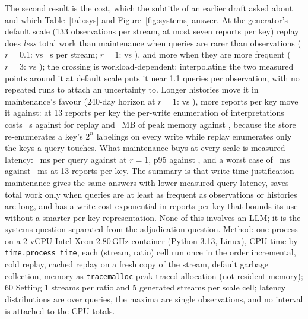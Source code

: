 The second result is the cost, which the subtitle of an earlier draft asked about and which Table~\ref{tab:sys} and Figure~\ref{fig:systems} answer. At the generator's default scale (133 observations per stream, at most seven reports per key) replay does \emph{less} total work than maintenance when queries are rarer than observations ($r=0.1$: \sysRpOneRepCpu{} vs \sysRpOneIncCpu{}~s per stream; $r=1$: \sysROneRepCpu{} vs \sysROneIncCpu{}), and more when they are more frequent ($r=3$: \sysRThreeRepCpu{} vs \sysRThreeIncCpu{}); the crossing is workload-dependent: interpolating the two measured points around it at default scale puts it near 1.1 queries per observation, with no repeated runs to attach an uncertainty to. Longer histories move it in maintenance's favour (240-day horizon at $r=1$: \sysTTwoFortyRepCpu{} vs \sysTTwoFortyIncCpu{}), more reports per key move it against: at 13 reports per key the per-write enumeration of interpretations costs \sysMThirteenIncCpu{}~s against \sysMThirteenRepCpu{} for replay and \sysMThirteenIncMem{}~MB of peak memory against \sysMThirteenRepMem{}, because the store re-enumerates a key's $2^n$ labelings on every write while replay enumerates only the keys a query touches. What maintenance buys at every scale is measured latency: \sysROneIncLat{}~ms per query against \sysROneRepLat{} at $r=1$, p95 \sysROneIncPNN{} against \sysROneRepPNN{}, and a worst case of \sysMThirteenIncMax{}~ms against \sysMThirteenRepMax{}~ms at 13 reports per key. The summary is that write-time justification maintenance gives the same answers with lower measured query latency, saves total work only when queries are at least as frequent as observations or histories are long, and has a write cost exponential in reports per key that bounds its use without a smarter per-key representation. None of this involves an LLM; it is the systems question separated from the adjudication question. Method: one process on a 2-vCPU Intel Xeon 2.80\,GHz container (Python 3.13, Linux), CPU time by \texttt{time.process\_time}, each (stream, ratio) cell run once in the order incremental, cold replay, cached replay on a fresh copy of the stream, default garbage collection, memory as \texttt{tracemalloc} peak traced allocation (not resident memory); 60 Setting 1 streams per ratio and 5 generated streams per scale cell; latency distributions are over queries, the maxima are single observations, and no interval is attached to the CPU totals.

